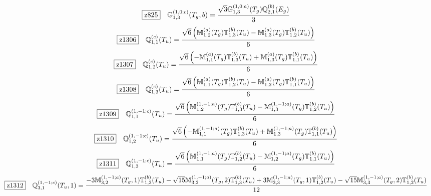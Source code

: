 \documentclass[fleqn,10pt,landscape]{jsarticle}
\begin{document}
\begin{dmath*}
\hspace*{3mm}\fbox{z825}\quad \mathbb{G}_{1,3}^{(1,0;c)}(T_{g},b)=\frac{\sqrt{3} \mathbb{G}_{1,3}^{(1,0;a)}(T_{g}) \mathbb{Q}_{2,1}^{(b)}(E_{g})}{3}
\end{dmath*}
\begin{dmath*}
\hspace*{3mm}\fbox{z1306}\quad \mathbb{Q}_{1,1}^{(c)}(T_{u})=\frac{\sqrt{6} \left(\mathbb{M}_{1,2}^{(a)}(T_{g}) \mathbb{T}_{1,3}^{(b)}(T_{u}) - \mathbb{M}_{1,3}^{(a)}(T_{g}) \mathbb{T}_{1,2}^{(b)}(T_{u})\right)}{6}
\end{dmath*}
\begin{dmath*}
\hspace*{3mm}\fbox{z1307}\quad \mathbb{Q}_{1,2}^{(c)}(T_{u})=\frac{\sqrt{6} \left(- \mathbb{M}_{1,1}^{(a)}(T_{g}) \mathbb{T}_{1,3}^{(b)}(T_{u}) + \mathbb{M}_{1,3}^{(a)}(T_{g}) \mathbb{T}_{1,1}^{(b)}(T_{u})\right)}{6}
\end{dmath*}
\begin{dmath*}
\hspace*{3mm}\fbox{z1308}\quad \mathbb{Q}_{1,3}^{(c)}(T_{u})=\frac{\sqrt{6} \left(\mathbb{M}_{1,1}^{(a)}(T_{g}) \mathbb{T}_{1,2}^{(b)}(T_{u}) - \mathbb{M}_{1,2}^{(a)}(T_{g}) \mathbb{T}_{1,1}^{(b)}(T_{u})\right)}{6}
\end{dmath*}
\begin{dmath*}
\hspace*{3mm}\fbox{z1309}\quad \mathbb{Q}_{1,1}^{(1,-1;c)}(T_{u})=\frac{\sqrt{6} \left(\mathbb{M}_{1,2}^{(1,-1;a)}(T_{g}) \mathbb{T}_{1,3}^{(b)}(T_{u}) - \mathbb{M}_{1,3}^{(1,-1;a)}(T_{g}) \mathbb{T}_{1,2}^{(b)}(T_{u})\right)}{6}
\end{dmath*}
\begin{dmath*}
\hspace*{3mm}\fbox{z1310}\quad \mathbb{Q}_{1,2}^{(1,-1;c)}(T_{u})=\frac{\sqrt{6} \left(- \mathbb{M}_{1,1}^{(1,-1;a)}(T_{g}) \mathbb{T}_{1,3}^{(b)}(T_{u}) + \mathbb{M}_{1,3}^{(1,-1;a)}(T_{g}) \mathbb{T}_{1,1}^{(b)}(T_{u})\right)}{6}
\end{dmath*}
\begin{dmath*}
\hspace*{3mm}\fbox{z1311}\quad \mathbb{Q}_{1,3}^{(1,-1;c)}(T_{u})=\frac{\sqrt{6} \left(\mathbb{M}_{1,1}^{(1,-1;a)}(T_{g}) \mathbb{T}_{1,2}^{(b)}(T_{u}) - \mathbb{M}_{1,2}^{(1,-1;a)}(T_{g}) \mathbb{T}_{1,1}^{(b)}(T_{u})\right)}{6}
\end{dmath*}
\begin{dmath*}
\hspace*{3mm}\fbox{z1312}\quad \mathbb{Q}_{3,1}^{(1,-1;c)}(T_{u},1)=\frac{- 3 \mathbb{M}_{3,2}^{(1,-1;a)}(T_{g},1) \mathbb{T}_{1,3}^{(b)}(T_{u}) - \sqrt{15} \mathbb{M}_{3,2}^{(1,-1;a)}(T_{g},2) \mathbb{T}_{1,3}^{(b)}(T_{u}) + 3 \mathbb{M}_{3,3}^{(1,-1;a)}(T_{g},1) \mathbb{T}_{1,2}^{(b)}(T_{u}) - \sqrt{15} \mathbb{M}_{3,3}^{(1,-1;a)}(T_{g},2) \mathbb{T}_{1,2}^{(b)}(T_{u})}{12}
\end{dmath*}
\end{document}
